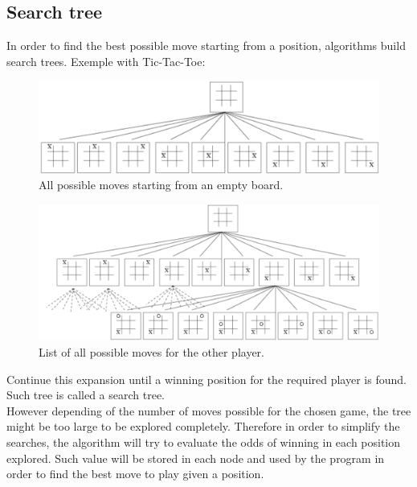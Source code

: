 \subsection{Search tree}
In order to find the best possible move starting from a position, algorithms build search trees. 
Exemple with Tic-Tac-Toe: \cite{images_annexes}
\begin{figure}[H]
	\centering
	\includegraphics[width=15cm]{5_Annexes/img/Tree1.png}
	\caption{\label{fig:tree1}All possible moves starting from an empty board.}
\end{figure}
\noindent
\begin{figure}[H]
	\centering
	\includegraphics[width=15cm]{5_Annexes/img/Tree2.png}
	\caption{\label{fig:tree2}List of all possible moves for the other player.}
\end{figure}
\noindent
Continue this expansion until a winning position for the required player is found. Such tree is called a search tree.
\bigskip\\
However depending of the number of moves possible for the chosen game, the tree might be too large to be explored completely. Therefore in order to simplify the searches, the algorithm will try to evaluate the odds of winning in each position explored. Such value will be stored in each node and used by the program in order to find the best move to play given a position.